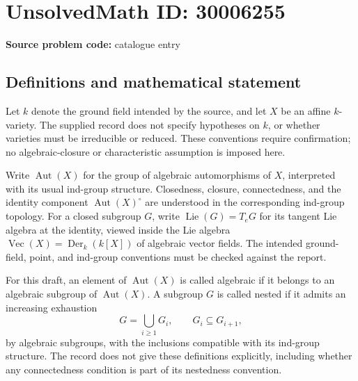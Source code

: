 \documentclass[11pt]{article}
\begin{document}
\section*{UnsolvedMath ID: 30006255}
\textbf{Source problem code:} catalogue entry
\subsection{Definitions and mathematical statement}
Let \(k\) denote the ground field intended by the source, and let \(X\) be an affine \(k\)-variety. The supplied record does not specify hypotheses on \(k\), or whether varieties must be irreducible or reduced. These conventions require confirmation; no algebraic-closure or characteristic assumption is imposed here.

Write \(\operatorname{Aut}(X)\) for the group of algebraic automorphisms of \(X\), interpreted with its usual ind-group structure. Closedness, closure, connectedness, and the identity component \(\operatorname{Aut}(X)^\circ\) are understood in the corresponding ind-group topology. For a closed subgroup \(G\), write \(\operatorname{Lie}(G)=T_eG\) for its tangent Lie algebra at the identity, viewed inside the Lie algebra \(\operatorname{Vec}(X)=\operatorname{Der}_k(k[X])\) of algebraic vector fields. The intended ground-field, point, and ind-group conventions must be checked against the report.

For this draft, an element of \(\operatorname{Aut}(X)\) is called algebraic if it belongs to an algebraic subgroup of \(\operatorname{Aut}(X)\). A subgroup \(G\) is called nested if it admits an increasing exhaustion
\[
G=\bigcup_{i\geq 1}G_i,\qquad G_i\subseteq G_{i+1},
\]
by algebraic subgroups, with the inclusions compatible with its ind-group structure. The record does not give these definitions explicitly, including whether any connectedness condition is part of its nestedness convention.
\end{document}
